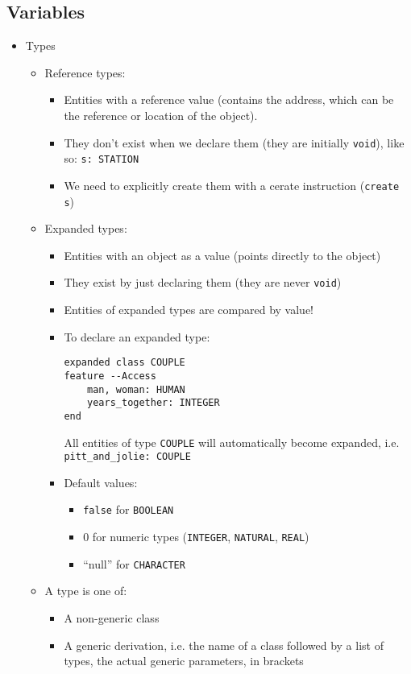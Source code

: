 \documentclass[a4paper]{article}
\newcommand{\inline}[1]{\lstinline!#1!}%
\begin{document}
\subsection{Variables}
\begin{itemize}
\item Types
\begin{itemize}
\item Reference types: 
\begin{itemize}
\item Entities with a reference value (contains the address, which can be the reference or location of the object).
\item They don't exist when we declare them (they are initially \inline{void}), like so: \inline{s: STATION}
\item We need to explicitly create them with a cerate instruction (\inline{create s})
\end{itemize}
\item Expanded types:
\begin{itemize}
\item Entities with an object as a value (points directly to the object)
\item They exist by just declaring them (they are never \inline{void})
\item Entities of expanded types are compared by value!
\item To declare an expanded type:
\begin{lstlisting}
expanded class COUPLE
feature --Access
	man, woman: HUMAN
	years_together: INTEGER
end
\end{lstlisting}
All entities of type \inline{COUPLE} will automatically become expanded, i.e. \inline{pitt_and_jolie: COUPLE}
\item Default values:
\begin{itemize}
\item \inline{false} for \inline{BOOLEAN}
\item 0 for numeric types (\inline{INTEGER}, \inline{NATURAL}, \inline{REAL})
\item ``null'' for \inline{CHARACTER}
\end{itemize}
\end{itemize}
\item A type is one of:
\begin{itemize}
\item A non-generic class
\item A generic derivation, i.e. the name of a class followed by a list of types, the actual generic parameters, in brackets

\end{itemize}
\end{itemize}
\end{itemize}
\end{document}
